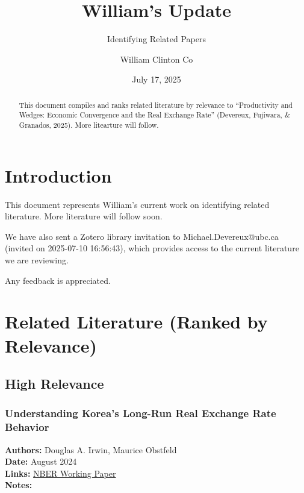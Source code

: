 \documentclass[
  11pt,
]{article}
\title{William's Update}
\subtitle{Identifying Related Papers}
\author{William Clinton Co}
\date{July 17, 2025}
\renewcommand*\contentsname{Table of contents}
\newcommand\contentsname{Table of contents}
\begin{document}
\maketitle
\begin{abstract}
This document compiles and ranks related literature by relevance to
``Productivity and Wedges: Economic Convergence and the Real Exchange
Rate'' (Devereux, Fujiwara, \& Granados, 2025). More litearture will
follow.
\end{abstract}

\renewcommand*\contentsname{Table of contents}
{
\hypersetup{linkcolor=}
\setcounter{tocdepth}{3}
\tableofcontents
}

\section{Introduction}\label{introduction}

This document represents William's current work on identifying related
literature. More literature will follow soon.

We have also sent a Zotero library invitation to Michael.Devereux@ubc.ca
(invited on 2025-07-10 16:56:43), which provides access to the current
literature we are reviewing.

Any feedback is appreciated.

\section{Related Literature (Ranked by
Relevance)}\label{related-literature-ranked-by-relevance}

\subsection{High Relevance}\label{high-relevance}

\subsubsection{Understanding Korea's Long-Run Real Exchange Rate
Behavior}\label{understanding-koreas-long-run-real-exchange-rate-behavior}

\textbf{Authors:} Douglas A. Irwin, Maurice Obstfeld\\
\textbf{Date:} August 2024\\
\textbf{Links:}
\href{https://www.nber.org/system/files/working_papers/w32769/w32769.pdf}{NBER
Working Paper}\\
\textbf{Notes:}
\end{document}
